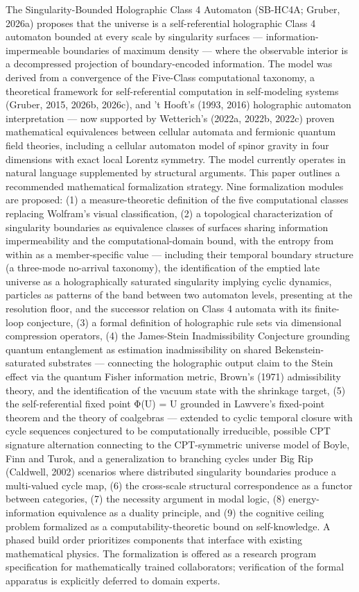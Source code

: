 \documentclass[
]{article}
\begin{document}
The Singularity-Bounded Holographic Class 4 Automaton (SB-HC4A; Gruber,
2026a) proposes that the universe is a self-referential holographic
Class 4 automaton bounded at every scale by singularity surfaces ---
information-impermeable boundaries of maximum density --- where the
observable interior is a decompressed projection of boundary-encoded
information. The model was derived from a convergence of the Five-Class
computational taxonomy, a theoretical framework for self-referential
computation in self-modeling systems (Gruber, 2015, 2026b, 2026c), and
't Hooft's (1993, 2016) holographic automaton interpretation --- now
supported by Wetterich's (2022a, 2022b, 2022c) proven mathematical
equivalences between cellular automata and fermionic quantum field
theories, including a cellular automaton model of spinor gravity in four
dimensions with exact local Lorentz symmetry. The model currently
operates in natural language supplemented by structural arguments. This
paper outlines a recommended mathematical formalization strategy. Nine
formalization modules are proposed: (1) a measure-theoretic definition
of the five computational classes replacing Wolfram's visual
classification, (2) a topological characterization of singularity
boundaries as equivalence classes of surfaces sharing information
impermeability and the computational-domain bound, with the entropy from
within as a member-specific value --- including their temporal boundary
structure (a three-mode no-arrival taxonomy), the identification of the
emptied late universe as a holographically saturated singularity
implying cyclic dynamics, particles as patterns of the band between two
automaton levels, presenting at the resolution floor, and the successor
relation on Class 4 automata with its finite-loop conjecture, (3) a
formal definition of holographic rule sets via dimensional compression
operators, (4) the James-Stein Inadmissibility Conjecture grounding
quantum entanglement as estimation inadmissibility on shared
Bekenstein-saturated substrates --- connecting the holographic output
claim to the Stein effect via the quantum Fisher information metric,
Brown's (1971) admissibility theory, and the identification of the
vacuum state with the shrinkage target, (5) the self-referential fixed
point Φ(U) = U grounded in Lawvere's fixed-point theorem and the theory
of coalgebras --- extended to cyclic temporal closure with cycle
sequences conjectured to be computationally irreducible, possible CPT
signature alternation connecting to the CPT-symmetric universe model of
Boyle, Finn and Turok, and a generalization to branching cycles under
Big Rip (Caldwell, 2002) scenarios where distributed singularity
boundaries produce a multi-valued cycle map, (6) the cross-scale
structural correspondence as a functor between categories, (7) the
necessity argument in modal logic, (8) energy-information equivalence as
a duality principle, and (9) the cognitive ceiling problem formalized as
a computability-theoretic bound on self-knowledge. A phased build order
prioritizes components that interface with existing mathematical
physics. The formalization is offered as a research program
specification for mathematically trained collaborators; verification of
the formal apparatus is explicitly deferred to domain experts.
\end{document}
